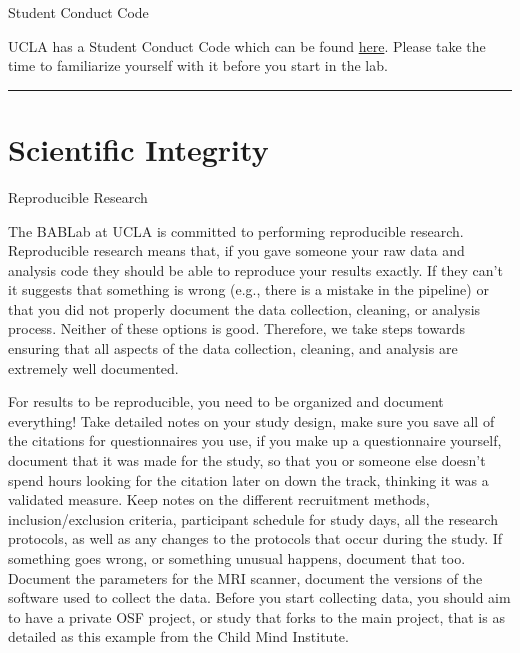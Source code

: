 \documentclass[]{book}
\begin{document}
Student Conduct Code

UCLA has a Student Conduct Code which can be found \href{https://www.deanofstudents.ucla.edu/Individual-Student-Code}{here}. Please take the time to familiarize yourself with it before you start in the lab.

\begin{center}\rule{0.5\linewidth}{\linethickness}\end{center}

\hypertarget{scientific-integrity}{%
\section{Scientific Integrity}\label{scientific-integrity}}

Reproducible Research

The BABLab at UCLA is committed to performing reproducible research. Reproducible research means that, if you gave someone your raw data and analysis code they should be able to reproduce your results exactly. If they can't it suggests that something is wrong (e.g., there is a mistake in the pipeline) or that you did not properly document the data collection, cleaning, or analysis process. Neither of these options is good. Therefore, we take steps towards ensuring that all aspects of the data collection, cleaning, and analysis are extremely well documented.

For results to be reproducible, you need to be organized and document everything! Take detailed notes on your study design, make sure you save all of the citations for questionnaires you use, if you make up a questionnaire yourself, document that it was made for the study, so that you or someone else doesn't spend hours looking for the citation later on down the track, thinking it was a validated measure. Keep notes on the different recruitment methods, inclusion/exclusion criteria, participant schedule for study days, all the research protocols, as well as any changes to the protocols that occur during the study. If something goes wrong, or something unusual happens, document that too. Document the parameters for the MRI scanner, document the versions of the software used to collect the data. Before you start collecting data, you should aim to have a private OSF project, or study that forks to the main project, that is as detailed as this example from the Child Mind Institute.
\end{document}

